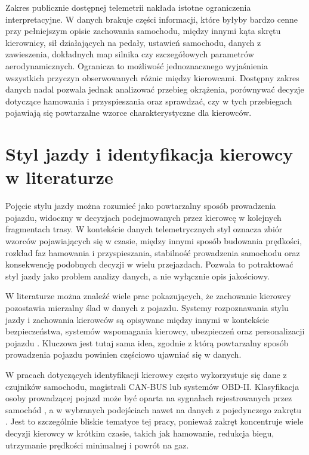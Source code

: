 \documentclass[printmode,pl]{mgr}
\begin{document}
Zakres publicznie dostępnej telemetrii nakłada istotne ograniczenia interpretacyjne. W danych brakuje części informacji, które byłyby bardzo cenne przy pełniejszym opisie zachowania samochodu, między innymi kąta skrętu kierownicy, sił działających na pedały, ustawień samochodu, danych z zawieszenia, dokładnych map silnika czy szczegółowych parametrów aerodynamicznych. Ogranicza to możliwość jednoznacznego wyjaśnienia wszystkich przyczyn obserwowanych różnic między kierowcami. Dostępny zakres danych nadal pozwala jednak analizować przebieg okrążenia, porównywać decyzje dotyczące hamowania i przyspieszania oraz sprawdzać, czy w tych przebiegach pojawiają się powtarzalne wzorce charakterystyczne dla kierowców.

\section{Styl jazdy i identyfikacja kierowcy w literaturze}

Pojęcie stylu jazdy można rozumieć jako powtarzalny sposób prowadzenia pojazdu, widoczny w decyzjach podejmowanych przez kierowcę w kolejnych fragmentach trasy. W kontekście danych telemetrycznych styl oznacza zbiór wzorców pojawiających się w czasie, między innymi sposób budowania prędkości, rozkład faz hamowania i przyspieszania, stabilność prowadzenia samochodu oraz konsekwencję podobnych decyzji w wielu przejazdach. Pozwala to potraktować styl jazdy jako problem analizy danych, a nie wyłącznie opis jakościowy.

W literaturze można znaleźć wiele prac pokazujących, że zachowanie kierowcy pozostawia mierzalny ślad w danych z pojazdu. Systemy rozpoznawania stylu jazdy i zachowania kierowców są opisywane między innymi w kontekście bezpieczeństwa, systemów wspomagania kierowcy, ubezpieczeń oraz personalizacji pojazdu \cite{driving_style_review}. Kluczowa jest tutaj sama idea, zgodnie z którą powtarzalny sposób prowadzenia pojazdu powinien częściowo ujawniać się w danych.

W pracach dotyczących identyfikacji kierowcy często wykorzystuje się dane z czujników samochodu, magistrali CAN-BUS lub systemów OBD-II. Klasyfikacja osoby prowadzącej pojazd może być oparta na sygnałach rejestrowanych przez samochód \cite{driver_can_identification}, a w wybranych podejściach nawet na danych z pojedynczego zakrętu \cite{hallac2016}. Jest to szczególnie bliskie tematyce tej pracy, ponieważ zakręt koncentruje wiele decyzji kierowcy w krótkim czasie, takich jak hamowanie, redukcja biegu, utrzymanie prędkości minimalnej i powrót na gaz.
\end{document}
